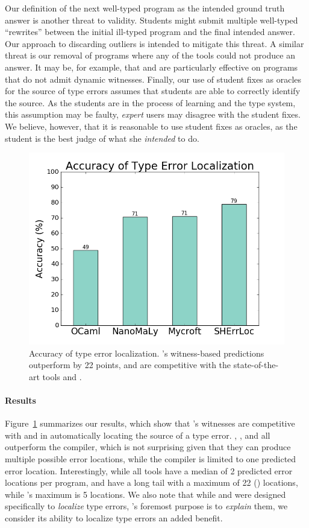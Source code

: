 Our definition of the next well-typed program as the intended ground
truth answer is another threat to validity. Students might submit
multiple well-typed ``rewrites'' between the initial ill-typed program
and the final intended answer.
%
Our approach to discarding outliers is intended to mitigate this threat.
%
A similar threat is our removal of programs where any of the tools could
not produce an answer.
%
It may be, for example, that \mycroft and \sherrloc are particularly
effective on programs that do not admit dynamic witnesses.
%
Finally, our use of student fixes as oracles for the source of type
errors assumes that students are able to correctly identify the source.
%
As the students are in the process of learning \ocaml and the type
system, this assumption may be faulty, \emph{expert} users may disagree
with the student fixes.
%
We believe, however, that it is reasonable to use student fixes as
oracles, as the student is the best judge of what she \emph{intended} to
do.

\begin{figure}[t]
\includegraphics[width=0.7\linewidth]{blame.png}
\caption{Accuracy of type error localization. \toolname's witness-based
  predictions outperform \ocaml by 22 points, and are competitive
  with the state-of-the-art tools \mycroft and \sherrloc.}
\label{fig:results-blame}
\end{figure}

\paragraph{Results}
Figure~\ref{fig:results-blame} summarizes our results, which show that
\toolname's witnesses are competitive with \mycroft and \sherrloc in
automatically locating the source of a type error.
%
\toolname, \mycroft, and \sherrloc all outperform the \ocaml compiler,
which is not surprising given that they can produce multiple possible
error locations, while the \ocaml compiler is limited to one predicted
error location.
%
Interestingly, while all tools have a median of 2 predicted error
locations per program, \mycroft and \sherrloc have a long tail with a
maximum of 22 () locations, while \toolname's maximum is 5
locations.
%
We also note that while \mycroft and \sherrloc were designed
specifically to \emph{localize} type errors, \toolname's foremost
purpose is to \emph{explain} them, we consider its ability to localize
type errors an added benefit.

